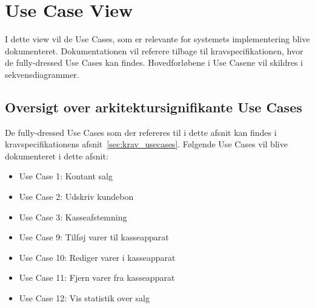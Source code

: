 \section{Use Case View}
I dette view vil de Use Cases, som er relevante for systemets implementering blive dokumenteret. Dokumentationen vil referere tilbage til kravspecifikationen, hvor de fully-dressed Use Cases kan findes. Hovedforløbene i Use Casene vil skildres i sekvensdiagrammer.

\subsection{Oversigt over arkitektursignifikante Use Cases}
De fully-dressed Use Cases som der refereres til i dette afsnit kan findes i kravspecifikationens afsnit~\ref{sec:krav_usecases}. Følgende Use Cases vil blive dokumenteret i dette afsnit:
\begin{itemize}
	\item Use Case 1: Kontant salg
	\item Use Case 2: Udskriv kundebon
	\item Use Case 3: Kasseafstemning
	\item Use Case 9: Tilføj varer til kasseapparat
	\item Use Case 10: Rediger varer i kasseapparat
	\item Use Case 11: Fjern varer fra kasseapparat
	\item Use Case 12: Vis statistik over salg
\end{itemize}













